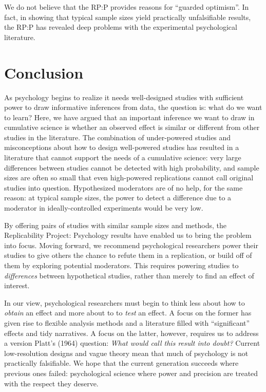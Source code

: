 \documentclass[doc,a4paper,floatsintext,draftfirst]{apa6}
\begin{document}
We do not believe that the RP:P provides reasons for ``guarded optimism''. In fact, in showing that typical sample sizes yield practically unfalsifiable results, the RP:P has revealed deep problems with the experimental psychological literature.

\section{Conclusion}

As psychology begins to realize it needs well-designed studies with sufficient power to draw informative inferences from data, the question is: what do we want to learn? Here, we have argued that an important inference we want to draw in cumulative science is whether an observed effect is similar or different from other studies in the literature. The combination of under-powered studies and misconceptions about how to design well-powered studies has resulted in a literature that cannot support the needs of a cumulative science: very large differences between studies cannot be detected with high probability, and sample sizes are often so small that even high-powered replications cannot call original studies into question. Hypothesized moderators are of no help, for the same reason: at typical sample sizes, the power to detect a difference due to a moderator in ideally-controlled experiments would be very low.

By offering pairs of studies with similar sample sizes and methods, the Replicability Project: Psychology results have enabled us to bring the problem into focus. Moving forward, we recommend psychological researchers power their studies to give others the chance to refute them in a replication, or build off of them by exploring potential moderators. This requires powering studies to {\em differences} between hypothetical studies, rather than merely to find an effect of interest.

In our view, psychological researchers must begin to think less about how to {\em obtain} an effect and more about to to {\em test} an effect. A focus on the former has given rise to flexible analysis methods \citep{Gelman:Loken:2014} and a literature filled with ``significant'' effects and tidy narratives. A focus on the latter, however, requires us to address a version Platt's (1964) question: {\em What would call this result into doubt?} Current low-resolution designs and vague theory mean that much of psychology is not practically falsifiable. We hope that the current generation succeeds where previous ones failed: psychological science where power and precision are treated with the respect they deserve.
\end{document}
